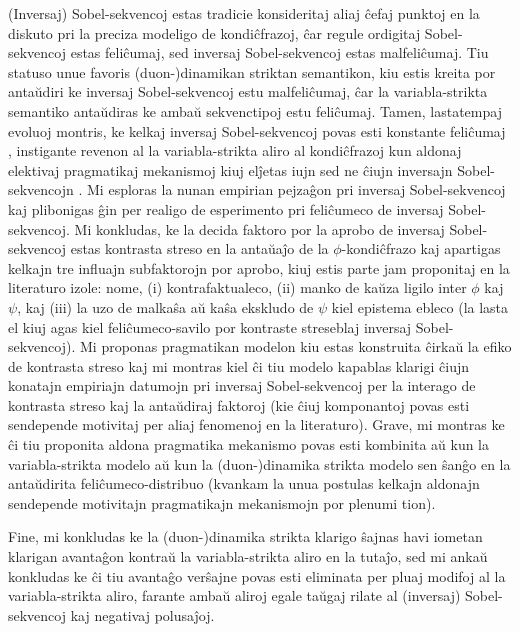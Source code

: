 \begin{otherlanguage}{esperanto}
(Inversaj) Sobel-sekvencoj estas tradicie konsideritaj aliaj ĉefaj punktoj en la diskuto pri la preciza modeligo de kondiĉfrazoj, ĉar regule ordigitaj Sobel-sekvencoj estas feliĉumaj, sed inversaj Sobel-sekvencoj estas malfeliĉumaj. Tiu statuso unue favoris (duon-)dinamikan striktan semantikon, kiu estis kreita por antaŭdiri ke inversaj Sobel-sekvencoj estu malfeliĉumaj, ĉar la variabla-strikta semantiko antaŭdiras ke ambaŭ sekvenctipoj estu feliĉumaj. Tamen, lastatempaj evoluoj montris, ke kelkaj inversaj Sobel-sekvencoj povas esti konstante feliĉumaj \parencite{Moss2012}, instigante revenon al la variabla-strikta aliro al kondiĉfrazoj kun aldonaj elektivaj pragmatikaj mekanismoj kiuj elĵetas iujn sed ne ĉiujn inversajn Sobel-sekvencojn \parencite{Moss2012,Klecha2014,Klecha2015,Lewis2018,Krassnig2017,Krassnig2020,Krassnig2022,Ippolito2020}. Mi esploras la nunan empirian pejzaĝon pri inversaj Sobel-sekvencoj kaj plibonigas ĝin per realigo de esperimento pri feliĉumeco de inversaj Sobel-sekvencoj. Mi konkludas, ke la decida faktoro por la aprobo de inversaj Sobel-sekvencoj estas kontrasta streso en la antaŭaĵo de la $\phi$-kondiĉfrazo kaj apartigas kelkajn tre influajn subfaktorojn por aprobo, kiuj estis parte jam proponitaj en la literaturo izole: nome, (i) kontrafaktualeco, (ii) manko de kaŭza ligilo inter $\phi$ kaj $\psi$, kaj (iii) la uzo de malkaŝa aŭ kaŝa ekskludo de $\psi$ kiel epistema ebleco (la lasta el kiuj agas kiel feliĉumeco-savilo por kontraste streseblaj inversaj Sobel-sekvencoj). Mi proponas pragmatikan modelon kiu estas konstruita ĉirkaŭ la efiko de kontrasta streso kaj mi montras kiel ĉi tiu modelo kapablas klarigi ĉiujn konatajn empiriajn datumojn pri inversaj Sobel-sekvencoj per la interago de kontrasta streso kaj la antaŭdiraj faktoroj (kie ĉiuj komponantoj povas esti sendepende motivitaj per aliaj fenomenoj en la literaturo). Grave, mi montras ke ĉi tiu proponita aldona pragmatika mekanismo povas esti kombinita aŭ kun la variabla-strikta modelo aŭ kun la (duon-)dinamika strikta modelo sen ŝanĝo en la antaŭdirita feliĉumeco-distribuo (kvankam la unua postulas kelkajn aldonajn sendepende motivitajn pragmatikajn mekanismojn por plenumi tion).
    
Fine, mi konkludas ke la (duon-)dinamika strikta klarigo ŝajnas havi iometan klarigan avantaĝon kontraŭ la variabla-strikta aliro en la tutaĵo, sed mi ankaŭ konkludas ke ĉi tiu avantaĝo verŝajne povas esti eliminata per pluaj modifoj al la variabla-strikta aliro, farante ambaŭ aliroj egale taŭgaj rilate al (inversaj) Sobel-sekvencoj kaj negativaj polusaĵoj.
\end{otherlanguage}

\cleardoublepage
